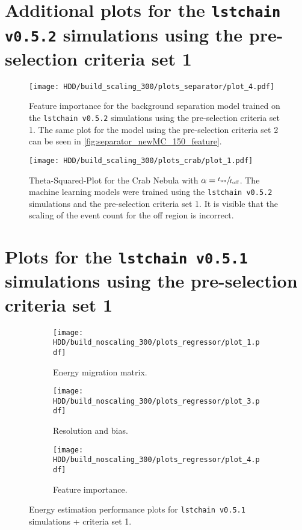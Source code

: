 \section{Additional plots for the \texttt{lstchain v0.5.2} simulations using the pre-selection criteria set 1}
\begin{figure}
    \centering
    \texttt{[image: HDD/build\_scaling\_300/plots\_separator/plot\_4.pdf]}
    \caption{Feature importance for the background separation model trained on the \texttt{lstchain v0.5.2} simulations using the pre-selection criteria set 1.
        The same plot for the model using the pre-selection criteria set 2 can be seen in \autoref{fig:separator_newMC_150_feature}.
    }
    \label{fig:separator_newMC_300_feature}
\end{figure}
\begin{figure}
    \centering
    \texttt{[image: HDD/build\_scaling\_300/plots\_crab/plot\_1.pdf]}
    \caption{Theta-Squared-Plot for the Crab Nebula with $\alpha = \sfrac{t_\text{on}}{t_\text{off}}$.
        The machine learning models were trained using the \texttt{lstchain v0.5.2} simulations and the pre-selection criteria set 1.
        It is visible that the scaling of the event count for the off region is incorrect.
    }
    \label{fig:crab_best_total_time}
\end{figure}


\section{Plots for the \texttt{lstchain v0.5.1} simulations using the pre-selection criteria set 1}

\begin{figure}
    \centering
    \begin{subfigure}{0.49\textwidth}
        \centering
        \texttt{[image: HDD/build\_noscaling\_300/plots\_regressor/plot\_1.pdf]}
        \caption{Energy migration matrix.}
    \end{subfigure}
    \hfill
    \begin{subfigure}{0.49\textwidth}
        \centering
        \texttt{[image: HDD/build\_noscaling\_300/plots\_regressor/plot\_3.pdf]}
        \caption{Resolution and bias.}
    \end{subfigure}
    \newline\vfill
    \begin{subfigure}{0.49\textwidth}
        \centering
        \texttt{[image: HDD/build\_noscaling\_300/plots\_regressor/plot\_4.pdf]}
        \caption{Feature importance.}
    \end{subfigure}
    \caption{Energy estimation performance plots for \texttt{lstchain v0.5.1} simulations + criteria set 1.}
    \label{fig:regressor_oldMC_300}
\end{figure}

